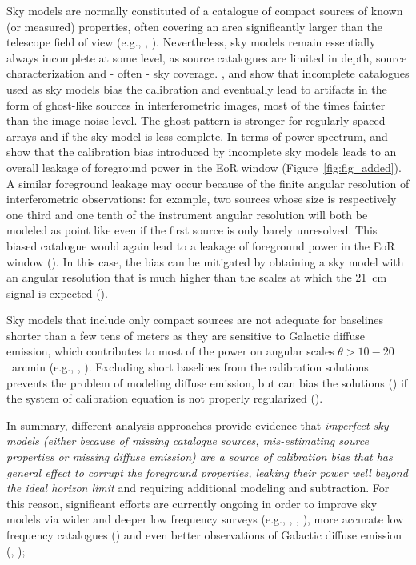 \begin{itemize}
Sky models are normally constituted of a catalogue of compact sources of known (or measured) properties, often covering an area significantly larger than the telescope field of view (e.g., \cite{yatawatta13}, \cite{pober16}). Nevertheless, sky models remain essentially always incomplete at some level, as source catalogues are limited in depth, source characterization and - often - sky coverage. \cite{grobler14}, \cite{wijnholds16} and \cite{grobler16} show that incomplete catalogues used as sky models bias the calibration and eventually lead to artifacts in the form of ghost-like sources in interferometric images, most of the times fainter than the image noise level. The ghost pattern is stronger for regularly spaced arrays and if the sky model is less complete. In terms of power spectrum, \cite{ewall-wice17} and \cite{barry16} show that the calibration bias introduced by incomplete sky models leads to an overall leakage of foreground power in the EoR window (Figure~\ref{fig:fig_added}). A similar foreground leakage may occur because of the finite angular resolution of interferometric observations: for example, two sources whose size is respectively one third and one tenth of the instrument angular resolution will both be modeled as point like even if the first source is only barely unresolved. This biased catalogue would again lead to a leakage of foreground power in the EoR window (\cite{procopio17}). In this case, the bias can be mitigated by obtaining a sky model with an angular resolution that is much higher than the scales at which the 21~cm signal is expected (\cite{procopio17}).

Sky models that include only compact sources are not adequate for baselines shorter than a few tens of meters as they are sensitive to Galactic diffuse emission, which contributes to most of the power on angular scales $\theta > 10-20$~arcmin (e.g., \cite{bernardi09}, \cite{choudhuri17}). Excluding short baselines from the calibration solutions prevents the problem of modeling diffuse emission, but can bias the solutions (\cite{patil16}) if the system of calibration equation is not properly regularized (\cite{sardabaradi19}).

In summary, different analysis approaches provide evidence that {\it imperfect sky models (either because of missing catalogue sources, mis-estimating source properties or missing diffuse emission) are a source of calibration bias that has general effect to corrupt the foreground properties, leaking their power well beyond the ideal horizon limit} and requiring additional modeling and subtraction. For this reason, significant efforts are currently ongoing in order to improve sky models via wider and deeper low frequency surveys (e.g., \cite{hurley-walker17}, \cite{intema17}, \cite{shimwell19}), more accurate low frequency catalogues (\cite{carroll16}) and even better observations of Galactic diffuse emission (\cite{zheng17}, \cite{dowell17}); 


\end{itemize}
